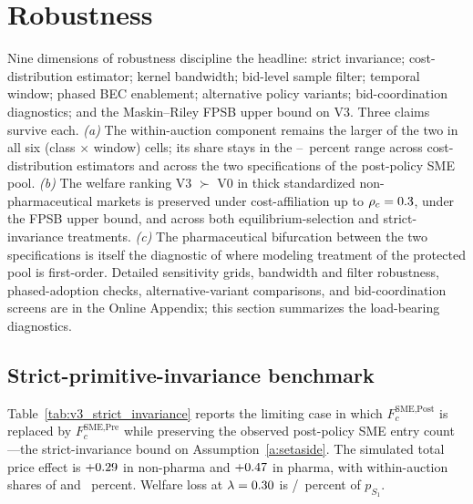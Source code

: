 \section{Robustness}\label{sec:robustness}

Nine dimensions of robustness discipline the headline: strict invariance; cost-distribution estimator; kernel bandwidth; bid-level sample filter; temporal window; phased BEC enablement; alternative policy variants; bid-coordination diagnostics; and the Maskin--Riley FPSB upper bound on V3. Three claims survive each. \emph{(a)} The within-auction component remains the larger of the two in all six (class $\times$ window) cells; its share stays in the \withinShareLow--\withinShareHigh~percent range across cost-distribution estimators and across the two specifications of the post-policy SME pool. \emph{(b)} The welfare ranking V3 $\succ$ V0 in thick standardized non-pharmaceutical markets is preserved under cost-affiliation up to $\rho_c = 0.3$, under the FPSB upper bound, and across both equilibrium-selection and strict-invariance treatments. \emph{(c)} The pharmaceutical bifurcation between the two specifications is itself the diagnostic of where modeling treatment of the protected pool is first-order. Detailed sensitivity grids, bandwidth and filter robustness, phased-adoption checks, alternative-variant comparisons, and bid-coordination screens are in the Online Appendix; this section summarizes the load-bearing diagnostics.

\subsection{Strict-primitive-invariance benchmark}

Table~\ref{tab:v3_strict_invariance} reports the limiting case in which $F_c^{\text{SME,Post}}$ is replaced by $F_c^{\text{SME,Pre}}$ while preserving the observed post-policy SME entry count---the strict-invariance bound on Assumption~\ref{a:setaside}. The simulated total price effect is $+0.29$ in non-pharma and $+0.47$ in pharma, with within-auction shares of \strictShareNp{} and \strictSharePh~percent. Welfare loss at $\lambda = 0.30$ is \siWelfLossPctNp/\siWelfLossPctPh~percent of $p_{S_1}$.

